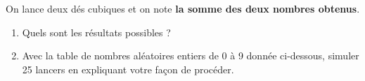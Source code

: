 \begin{exo}\label{fluctuex1}
On lance deux d\'es cubiques et on note \textbf{la somme des deux nombres obtenus}.
\begin{enumerate}
	\item Quels sont les r\'esultats possibles ?
	\item Avec la table de nombres al\'eatoires entiers de 0 \`a 9 donn\'ee ci-dessous, simuler 25 lancers en expliquant votre façon de proc\'eder.

\reinitrand[first=0, last=9] %
\begin{center}
\rand{} \quad \rand{} \quad \rand{} \quad \rand{} \quad \rand{} \quad \rand{} \quad \rand{} \quad \rand{} \quad \rand{} \quad \rand{} \quad \rand{} \quad \rand{} \quad \rand{} \quad \rand{} \quad \rand{} \quad \rand{} \quad \rand{} \quad \rand{} \quad \rand{} \quad \rand{}

\rand{} \quad \rand{} \quad \rand{} \quad \rand{} \quad \rand{} \quad \rand{} \quad \rand{} \quad \rand{} \quad \rand{} \quad \rand{} \quad \rand{} \quad \rand{} \quad \rand{} \quad \rand{} \quad \rand{} \quad \rand{} \quad \rand{} \quad \rand{} \quad \rand{} \quad \rand{}

\rand{} \quad \rand{} \quad \rand{} \quad \rand{} \quad \rand{} \quad \rand{} \quad \rand{} \quad \rand{} \quad \rand{} \quad \rand{} \quad \rand{} \quad \rand{} \quad \rand{} \quad \rand{} \quad \rand{} \quad \rand{} \quad \rand{} \quad \rand{} \quad \rand{} \quad \rand{}

\rand{} \quad \rand{} \quad \rand{} \quad \rand{} \quad \rand{} \quad \rand{} \quad \rand{} \quad \rand{} \quad \rand{} \quad \rand{} \quad \rand{} \quad \rand{} \quad \rand{} \quad \rand{} \quad \rand{} \quad \rand{} \quad \rand{} \quad \rand{} \quad \rand{} \quad \rand{}


\end{center}
\end{enumerate}
\end{exo}
